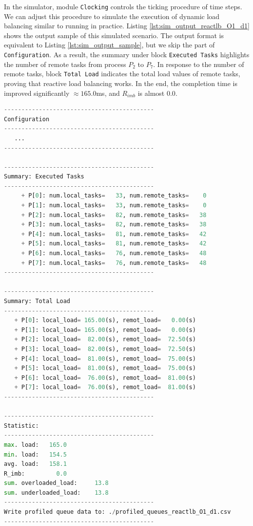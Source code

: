 In the simulator, module \texttt{Clocking} controls the ticking procedure of time steps. We can adjust this procedure to simulate the execution of dynamic load balancing similar to running in practice. Listing \ref{lst:sim_output_reactlb_O1_d1} shows the output sample of this simulated scenario. The output format is equivalent to Listing \ref{lst:sim_output_sample}, but we skip the part of \texttt{Configuration}. As a result, the summary under block \texttt{Executed Tasks} highlights the number of remote tasks from process $P_{2}$ to $P_{7}$. In response to the number of remote tasks, block \texttt{Total Load} indicates the total load values of remote tasks, proving that reactive load balancing works. In the end, the completion time is improved significantly $\approx 165.0$ms, and $R_{imb}$ is almost $0.0$.

\begin{lstlisting}[language=Python, caption={The simulation output of reactive load balancing with $O_{\text{balancing}} = 1.0$ms, $d=1$ms}, label={lst:sim_output_reactlb_O1_d1}]
-------------------------------------------
Configuration
-------------------------------------------
   ...
-------------------------------------------

-------------------------------------------
Summary: Executed Tasks
-------------------------------------------
	 + P[0]: num.local_tasks=   33, num.remote_tasks=    0
	 + P[1]: num.local_tasks=   33, num.remote_tasks=    0
	 + P[2]: num.local_tasks=   82, num.remote_tasks=   38
	 + P[3]: num.local_tasks=   82, num.remote_tasks=   38
	 + P[4]: num.local_tasks=   81, num.remote_tasks=   42
	 + P[5]: num.local_tasks=   81, num.remote_tasks=   42
	 + P[6]: num.local_tasks=   76, num.remote_tasks=   48
	 + P[7]: num.local_tasks=   76, num.remote_tasks=   48
-------------------------------------------
	
-------------------------------------------
Summary: Total Load
-------------------------------------------
   + P[0]: local_load= 165.00(s), remot_load=   0.00(s)
   + P[1]: local_load= 165.00(s), remot_load=   0.00(s)
   + P[2]: local_load=  82.00(s), remot_load=  72.50(s)
   + P[3]: local_load=  82.00(s), remot_load=  72.50(s)
   + P[4]: local_load=  81.00(s), remot_load=  75.00(s)
   + P[5]: local_load=  81.00(s), remot_load=  75.00(s)
   + P[6]: local_load=  76.00(s), remot_load=  81.00(s)
   + P[7]: local_load=  76.00(s), remot_load=  81.00(s)
-------------------------------------------

-------------------------------------------
Statistic:
-------------------------------------------
max. load:   165.0
min. load:   154.5
avg. load:   158.1
R_imb:         0.0
sum. overloaded_load:     13.8
sum. underloaded_load:    13.8
-------------------------------------------
Write profiled queue data to: ./profiled_queues_reactlb_O1_d1.csv
-------------------------------------------
\end{lstlisting}


